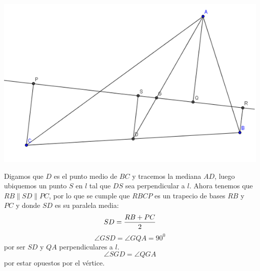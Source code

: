 \documentclass{book}
\begin{document}
\begin{enumerate}
\begin{center}
              \includegraphics[scale=1]{imagenes/Geometria/5.png}
          \end{center}
          Digamos que $D$ es el punto medio de $BC$ y tracemos la mediana $AD$, luego ubiquemos un punto $S$ en $l$ tal que $DS$ sea perpendicular a $l$. Ahora tenemos que $RB\parallel SD\parallel PC$, por lo que se cumple que $RBCP$ es un trapecio de bases $RB$ y $PC$ y donde $SD$ es su paralela media:
          $$SD={RB+PC\over 2}$$
          $$\angle GSD=\angle GQA={90} ^0$$
          por ser $SD$ y $QA$ perpendiculares a $l$.
          $$\angle SGD=\angle QGA$$
          por estar opuestos por el vértice.\\
          

\end{enumerate}
\end{document}
